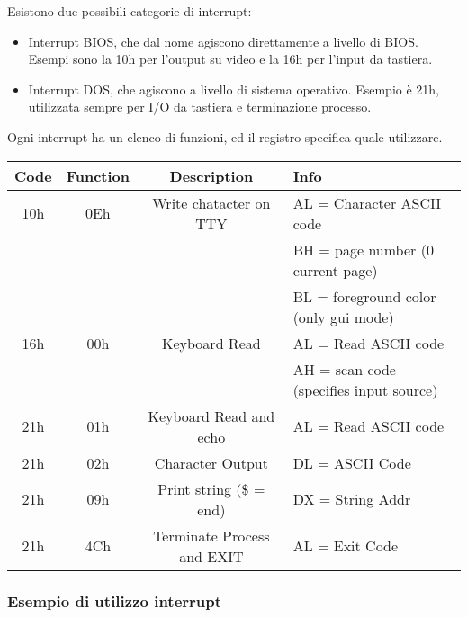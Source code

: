 \documentclass[../template]{subfiles}
\begin{document}
Esistono due possibili categorie di interrupt:
\begin{itemize}
    \item Interrupt BIOS, che dal nome agiscono direttamente a livello di BIOS.
        Esempi sono la 10h per l'output su video e la 16h per l'input da tastiera.
    \item Interrupt DOS, che agiscono a livello di sistema operativo.
        Esempio è 21h, utilizzata sempre per I/O da tastiera e terminazione processo.
\end{itemize}
Ogni interrupt ha un elenco di funzioni, ed il registro \ah specifica quale utilizzare.

\begin{center}
\begin{tabu}{|c|c|c|l|}
    \hline
    Code & Function & Description & Info \\
    \hline
    10h & 0Eh &Write chatacter on TTY & AL = Character ASCII code\\
        & & & BH = page number (0 current page) \\
        & & & BL = foreground color (only gui mode)\\
    \hline
    16h & 00h & Keyboard Read & AL = Read ASCII code\\
        &     &               & AH = scan code (specifies input source)\\
    \hline
    21h & 01h & Keyboard Read and echo & AL = Read ASCII code\\
    \hline
    21h & 02h & Character Output & DL = ASCII Code\\
    \hline
    21h & 09h & Print string (\$ = end) & DX = String Addr\\
    \hline
    21h & 4Ch & Terminate Process and EXIT & AL = Exit Code\\
    \hline
\end{tabu}
\end{center}

\subsubsection{Esempio di utilizzo interrupt}

\end{document}
